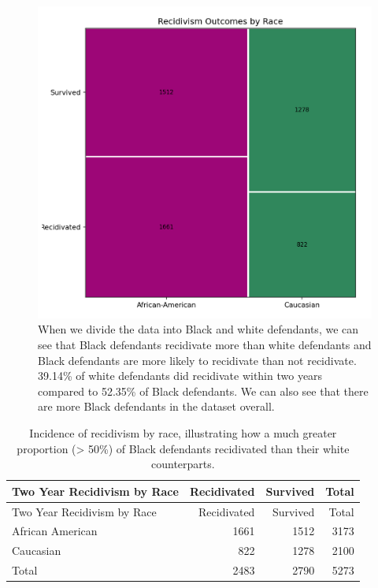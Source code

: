 \documentclass[water,article,submit,moreauthors,pdftex]{mdpi}
\begin{document}
\begin{figure}

{\centering \includegraphics[width=1\linewidth]{../images/recidivism_mosaic} 

}

\caption{When we divide the data into Black and white defendants, we can see that Black defendants recidivate more than white defendants and Black defendants are more likely to recidivate than not recidivate. 39.14\% of white defendants did recidivate within two years compared to 52.35\% of Black defendants. We can also see that there are more Black defendants in the dataset overall.}\label{fig:recidivism mosaic}
\end{figure}

\begin{longtable}[]{@{}lrrr@{}}
\caption{Incidence of recidivism by race, illustrating how a much
greater proportion (\textgreater{} 50\%) of Black defendants recidivated
than their white counterparts. \label{tab:recid table}}\tabularnewline
\toprule
Two Year Recidivism by Race & Recidivated & Survived &
Total\tabularnewline
\midrule
\endfirsthead
\toprule
Two Year Recidivism by Race & Recidivated & Survived &
Total\tabularnewline
\midrule
\endhead
African American & 1661 & 1512 & 3173\tabularnewline
Caucasian & 822 & 1278 & 2100\tabularnewline
Total & 2483 & 2790 & 5273\tabularnewline
\bottomrule
\end{longtable}
\end{document}

